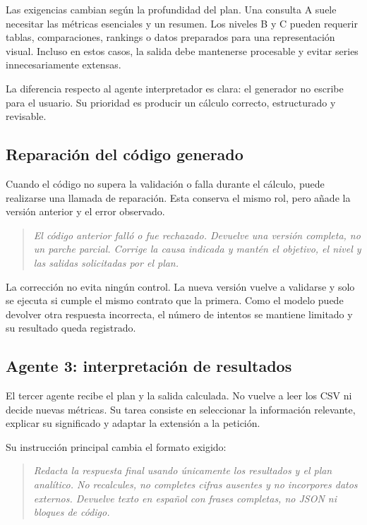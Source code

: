 Las exigencias cambian según la profundidad del plan. Una consulta A suele necesitar las métricas esenciales y un resumen. Los niveles B y C pueden requerir tablas, comparaciones, rankings o datos preparados para una representación visual. Incluso en estos casos, la salida debe mantenerse procesable y evitar series innecesariamente extensas.

La diferencia respecto al agente interpretador es clara: el generador no escribe para el usuario. Su prioridad es producir un cálculo correcto, estructurado y revisable.

\subsection{Reparación del código generado}

Cuando el código no supera la validación o falla durante el cálculo, puede realizarse una llamada de reparación. Esta conserva el mismo rol, pero añade la versión anterior y el error observado.

\begin{quote}
\small
\textit{El código anterior falló o fue rechazado. Devuelve una versión completa, no un parche parcial. Corrige la causa indicada y mantén el objetivo, el nivel y las salidas solicitadas por el plan.}
\end{quote}

La corrección no evita ningún control. La nueva versión vuelve a validarse y solo se ejecuta si cumple el mismo contrato que la primera. Como el modelo puede devolver otra respuesta incorrecta, el número de intentos se mantiene limitado y su resultado queda registrado.

\subsection{Agente 3: interpretación de resultados}

El tercer agente recibe el plan y la salida calculada. No vuelve a leer los CSV ni decide nuevas métricas. Su tarea consiste en seleccionar la información relevante, explicar su significado y adaptar la extensión a la petición.

Su instrucción principal cambia el formato exigido:

\begin{quote}
\small
\textit{Redacta la respuesta final usando únicamente los resultados y el plan analítico. No recalcules, no completes cifras ausentes y no incorpores datos externos. Devuelve texto en español con frases completas, no JSON ni bloques de código.}
\end{quote}

